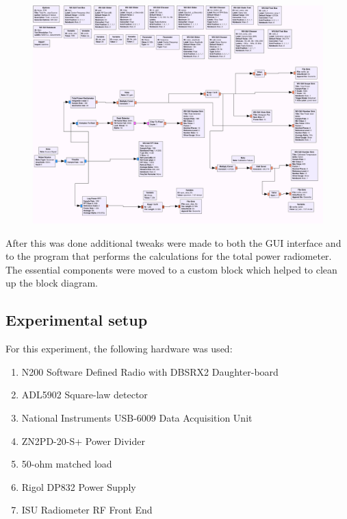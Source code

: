 {\begin{figure}[h!tb] \centering
\includegraphics[width=\textwidth]{Images/noisesrc_radiometer.png}
\label{noise_test}
\end{figure}
}

After this was done additional tweaks were made to both the GUI interface and to the program that performs the calculations for the total power radiometer.  The essential components were moved to a custom block which helped to clean up the block diagram.  

\subsection{Experimental setup} \label{exp1_setup}
For this experiment, the following hardware was used:

\begin{enumerate}
\item N200 Software Defined Radio with DBSRX2 Daughter-board
\item ADL5902 Square-law detector
\item National Instruments USB-6009 Data Acquisition Unit
\item ZN2PD-20-S+ Power Divider
\item 50-ohm matched load
\item Rigol DP832 Power Supply
\item ISU Radiometer RF Front End
\end{enumerate}

